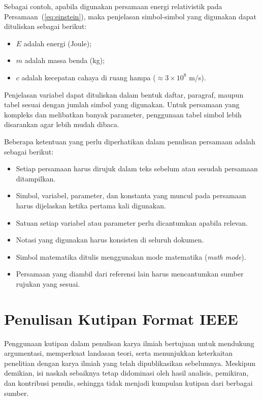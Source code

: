 Sebagai contoh, apabila digunakan persamaan energi relativistik pada Persamaan~(\ref{eq:einstein}), maka penjelasan simbol-simbol yang digunakan dapat dituliskan sebagai berikut:

\begin{itemize}[topsep=0pt,itemsep=0pt,parsep=0pt,leftmargin=*]
\item $E$ adalah energi (Joule);
\item $m$ adalah massa benda (kg);
\item $c$ adalah kecepatan cahaya di ruang hampa ($\approx 3 \times 10^8$ m/s).
\end{itemize}

Penjelasan variabel dapat dituliskan dalam bentuk daftar, paragraf, maupun tabel sesuai dengan jumlah simbol yang digunakan. Untuk persamaan yang kompleks dan melibatkan banyak parameter, penggunaan tabel simbol lebih disarankan agar lebih mudah dibaca.

Beberapa ketentuan yang perlu diperhatikan dalam penulisan persamaan adalah sebagai berikut:

\begin{itemize}[topsep=0pt,itemsep=0pt,parsep=0pt,leftmargin=*]
\item Setiap persamaan harus dirujuk dalam teks sebelum atau sesudah persamaan ditampilkan.
\item Simbol, variabel, parameter, dan konstanta yang muncul pada persamaan harus dijelaskan ketika pertama kali digunakan.
\item Satuan setiap variabel atau parameter perlu dicantumkan apabila relevan.
\item Notasi yang digunakan harus konsisten di seluruh dokumen.
\item Simbol matematika ditulis menggunakan mode matematika (\textit{math mode}).
\item Persamaan yang diambil dari referensi lain harus mencantumkan sumber rujukan yang sesuai.
\end{itemize}

\section{Penulisan Kutipan Format IEEE}

Penggunaan kutipan dalam penulisan karya ilmiah bertujuan untuk mendukung argumentasi, memperkuat landasan teori, serta menunjukkan keterkaitan penelitian dengan karya ilmiah yang telah dipublikasikan sebelumnya. Meskipun demikian, isi naskah sebaiknya tetap didominasi oleh hasil analisis, pemikiran, dan kontribusi penulis, sehingga tidak menjadi kumpulan kutipan dari berbagai sumber.


